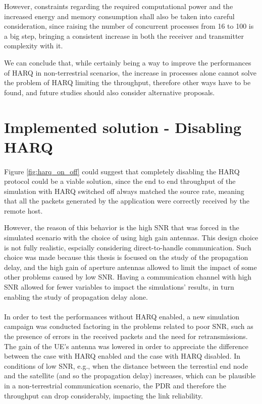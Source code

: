 However, constraints regarding the required computational power and the increased energy and memory consumption shall also be taken into careful consideration, since raising the number of concurrent processes from 16 to 100 is a big step, bringing a consistent increase in both the receiver and transmitter complexity with it.

We can conclude that, while certainly being a way to improve the performances of \ac{HARQ} in non-terrestrial scenarios, the increase in processes alone cannot solve the problem of \ac{HARQ} limiting the throughput, therefore other ways have to be found, and future studies should also consider alternative proposals.


\section{Implemented solution - Disabling HARQ}
\paragraph{}
Figure \ref{fig:harq_on_off} could suggest that completely disabling the \ac{HARQ} protocol could be a viable solution, since the end to end throughput of the simulation with \ac{HARQ} switched off always matched the source rate, meaning that all the packets generated by the application were correctly received by the remote host.

However, the reason of this behavior is the high \ac{SNR} that was forced in the simulated scenario with the choice of using high gain antennas. This design choice is not fully realistic, espcially considering direct-to-handle communication. Such choice was made because this thesis is focused on the study of the propagation delay, and the high gain of aperture antennas allowed to limit the impact of some other problems caused by low \ac{SNR}. Having a communication channel with high \ac{SNR} allowed for fewer variables to impact the simulations' results, in turn enabling the study of propagation delay alone.

\paragraph{}
In order to test the performances without \ac{HARQ} enabled, a new simulation campaign was conducted factoring in the problems related to poor \ac{SNR}, such as the presence of errors in the received packets and the need for retransmissions. The gain of the \ac{UE}'s antenna was lowered in order to appreciate the difference between the case with \ac{HARQ} enabled and the case with \ac{HARQ} disabled. In conditions of low \ac{SNR}, e.g., when the distance between the terrestial end node and the satellite (and so the propagation delay) increases, which can be plausible in a non-terrestrial communication scenario, the \ac{PDR} and therefore the throughput can drop considerably, impacting the link reliability.

